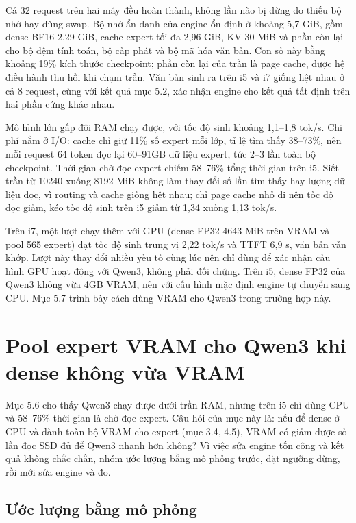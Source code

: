Cả 32 request trên hai máy đều hoàn thành, không lần nào bị dừng do thiếu bộ nhớ hay dùng swap. Bộ nhớ ẩn danh của engine ổn định ở khoảng 5,7 GiB, gồm dense BF16 2,29 GiB, cache expert tối đa 2,96 GiB, KV 30 MiB và phần còn lại cho bộ đệm tính toán, bộ cấp phát và bộ mã hóa văn bản. Con số này bằng khoảng 19\% kích thước checkpoint; phần còn lại của trần là page cache, được hệ điều hành thu hồi khi chạm trần. Văn bản sinh ra trên i5 và i7 giống hệt nhau ở cả 8 request, cùng với kết quả mục 5.2, xác nhận engine cho kết quả tất định trên hai phần cứng khác nhau.

Mô hình lớn gấp đôi RAM chạy được, với tốc độ sinh khoảng 1,1--1,8 tok/s. Chi phí nằm ở I/O: cache chỉ giữ 11\% số expert mỗi lớp, tỉ lệ tìm thấy 38--73\%, nên mỗi request 64 token đọc lại 60--91GB dữ liệu expert, tức 2--3 lần toàn bộ checkpoint. Thời gian chờ đọc expert chiếm 58--76\% tổng thời gian trên i5. Siết trần từ 10240 xuống 8192 MiB không làm thay đổi số lần tìm thấy hay lượng dữ liệu đọc, vì routing và cache giống hệt nhau; chỉ page cache nhỏ đi nên tốc độ đọc giảm, kéo tốc độ sinh trên i5 giảm từ 1,34 xuống 1,13 tok/s.

Trên i7, một lượt chạy thêm với GPU (dense FP32 4643 MiB trên VRAM và pool 565 expert) đạt tốc độ sinh trung vị 2,22 tok/s và TTFT 6,9 s, văn bản vẫn khớp. Lượt này thay đổi nhiều yếu tố cùng lúc nên chỉ dùng để xác nhận cấu hình GPU hoạt động với Qwen3, không phải đối chứng. Trên i5, dense FP32 của Qwen3 không vừa 4GB VRAM, nên với cấu hình mặc định engine tự chuyển sang CPU. Mục 5.7 trình bày cách dùng VRAM cho Qwen3 trong trường hợp này.

\section{Pool expert VRAM cho Qwen3 khi dense không vừa VRAM}
\label{sec:vram_pool}

Mục 5.6 cho thấy Qwen3 chạy được dưới trần RAM, nhưng trên i5 chỉ dùng CPU và 58--76\% thời gian là chờ đọc expert. Câu hỏi của mục này là: nếu để dense ở CPU và dành toàn bộ VRAM cho expert (mục 3.4, 4.5), VRAM có giảm được số lần đọc SSD đủ để Qwen3 nhanh hơn không? Vì việc sửa engine tốn công và kết quả không chắc chắn, nhóm ước lượng bằng mô phỏng trước, đặt ngưỡng dừng, rồi mới sửa engine và đo.

\subsection{Ước lượng bằng mô phỏng}

